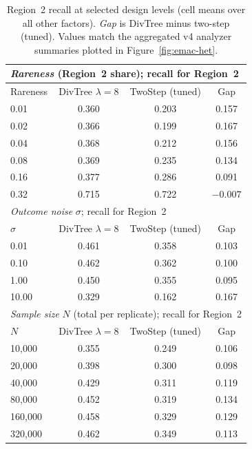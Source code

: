 \begin{table}[t!]
\centering
\footnotesize
\setlength{\tabcolsep}{4pt}
\begin{tabular}{lccc}
\toprule
\multicolumn{4}{l}{\emph{Rareness} (Region~2 share); recall for Region~2} \\
\midrule
Rareness & DivTree $\lambda{=}8$ & TwoStep (tuned) & Gap \\
\midrule
0.01 & 0.360 & 0.203 & 0.157 \\
0.02 & 0.366 & 0.199 & 0.167 \\
0.04 & 0.368 & 0.212 & 0.156 \\
0.08 & 0.369 & 0.235 & 0.134 \\
0.16 & 0.377 & 0.286 & 0.091 \\
0.32 & 0.715 & 0.722 & $-0.007$ \\
\midrule
\multicolumn{4}{l}{\emph{Outcome noise} $\sigma$; recall for Region~2} \\
\midrule
$\sigma$ & DivTree $\lambda{=}8$ & TwoStep (tuned) & Gap \\
\midrule
0.01 & 0.461 & 0.358 & 0.103 \\
0.10 & 0.462 & 0.362 & 0.100 \\
1.00 & 0.450 & 0.355 & 0.095 \\
10.00 & 0.329 & 0.162 & 0.167 \\
\midrule
\multicolumn{4}{l}{\emph{Sample size} $N$ (total per replicate); recall for Region~2} \\
\midrule
$N$ & DivTree $\lambda{=}8$ & TwoStep (tuned) & Gap \\
\midrule
10{,}000 & 0.355 & 0.249 & 0.106 \\
20{,}000 & 0.398 & 0.300 & 0.098 \\
40{,}000 & 0.429 & 0.311 & 0.119 \\
80{,}000 & 0.452 & 0.319 & 0.134 \\
160{,}000 & 0.458 & 0.329 & 0.129 \\
320{,}000 & 0.462 & 0.349 & 0.113 \\
\bottomrule
\end{tabular}
\caption{\label{tab:recall-het-by-factor}
Region~2 recall at selected design levels (cell means over all other factors). \emph{Gap} is DivTree minus two-step (tuned). Values match the aggregated v4 analyzer summaries plotted in Figure~\ref{fig:emac-het}.}
\end{table}
